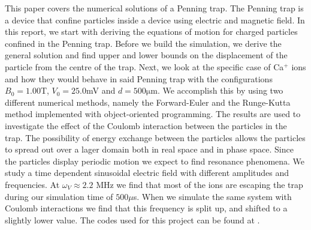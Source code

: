 This paper covers the numerical solutions of a Penning trap. The Penning trap
is a device that confine particles inside a device using electric and magnetic field.
 In this report, we start with deriving the equations of motion for charged
 particles confined in the Penning trap.
Before we build the simulation, we derive the general solution and find
upper and lower bounds on the displacement of the particle from the centre of the trap.
Next, we look at the specific case of Ca$^+$ ions and how they would behave in
said Penning trap with the configurations $B_0 = 1.00$T, $V_0 = 25.0$mV and
$d = 500\si{\micro\meter}$.
We accomplish this by using two different numerical methods, namely the Forward-Euler and the
Runge-Kutta method implemented with object-oriented programming.
The results are used to investigate the effect of the Coulomb interaction
between the particles in the trap. The possibility of energy exchange between the
particles allows the particles to spread out over a lager domain both in
real space and in phase space.
Since the particles display periodic motion we expect to find resonance phenomena.
We study a time dependent sinusoidal electric field with different amplitudes
and frequencies.
At $\omega_V \approx 2.2$ MHz we find that
most of the ions are escaping the trap during our simulation time of $500 \mu$s.
When we simulate the same system with Coulomb interactions we find that
this frequency is split up, and shifted to a slightly lower value.
The codes used for this project can be found at \url{}.
 

